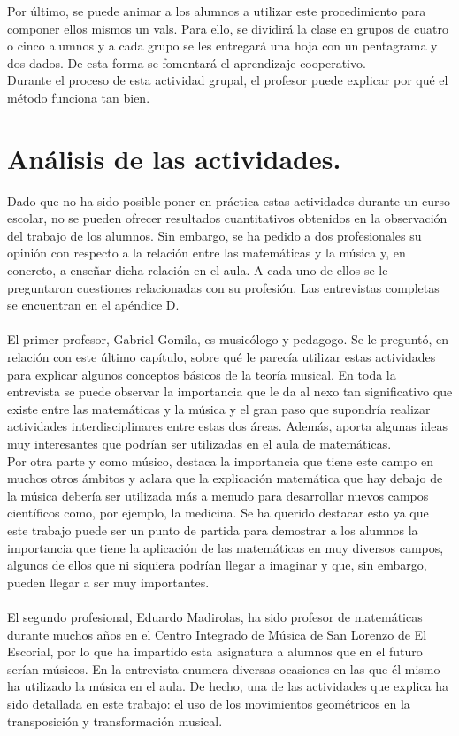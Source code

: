 \documentclass[a4paper, openright, 11pt, titlepage]{report}
\theoremstyle{definition}\newtheorem{defin}[propo]{Definition}
\theoremstyle{definition}\newtheorem{obser}[propo]{Remark}
\theoremstyle{definition}\newtheorem{ejem}[propo]{Ejemplo}
\theoremstyle{definition}\newtheorem{algoritmo}[propo]{Algoritmo}
\begin{document}
Por último, se puede animar a los alumnos a utilizar este procedimiento para componer ellos mismos un vals. Para ello, se dividirá la clase en grupos de cuatro o cinco alumnos y a cada grupo se les entregará una hoja con un pentagrama y dos dados. De esta forma se fomentará el aprendizaje cooperativo.\\
Durante el proceso de esta actividad grupal, el profesor puede explicar por qué el método funciona tan bien.  

\section{Análisis de las actividades.}
Dado que no ha sido posible poner en práctica estas actividades durante un curso escolar, no se pueden ofrecer resultados cuantitativos obtenidos en la observación del trabajo de los alumnos. Sin embargo, se ha pedido a dos profesionales su opinión con respecto a la relación entre las matemáticas y la música y, en concreto, a enseñar dicha relación en el aula. A cada uno de ellos se le preguntaron cuestiones relacionadas con su profesión. Las entrevistas completas se encuentran en el apéndice D.\\\\
El primer profesor, Gabriel Gomila, es musicólogo y pedagogo. Se le preguntó, en relación con este último capítulo, sobre qué le parecía utilizar estas actividades para explicar algunos conceptos básicos de la teoría musical. En toda la entrevista se puede observar la importancia que le da al nexo tan significativo que existe entre las matemáticas y la música y el gran paso que supondría realizar actividades interdisciplinares entre estas dos áreas. Además, aporta algunas ideas muy interesantes que podrían ser utilizadas en el aula de matemáticas.\\
Por otra parte y como músico, destaca la importancia que tiene este campo en muchos otros ámbitos y aclara que la explicación matemática que hay debajo de la música debería ser utilizada más a menudo para desarrollar nuevos campos científicos como, por ejemplo, la medicina. Se ha querido destacar esto ya que este trabajo puede ser un punto de partida para demostrar a los alumnos la importancia que tiene la aplicación de las matemáticas en muy diversos campos, algunos de ellos que ni siquiera podrían llegar a imaginar y que, sin embargo, pueden llegar a ser muy importantes.\\\\
El segundo profesional, Eduardo Madirolas, ha sido profesor de matemáticas durante muchos años en el Centro Integrado de Música de San Lorenzo de El Escorial, por lo que ha impartido esta asignatura a alumnos que en el futuro serían músicos. En la entrevista enumera diversas ocasiones en las que él mismo ha utilizado la música en el aula. De hecho, una de las actividades que explica ha sido detallada en este trabajo: el uso de los movimientos geométricos en la transposición y transformación musical.\\
\end{document}
